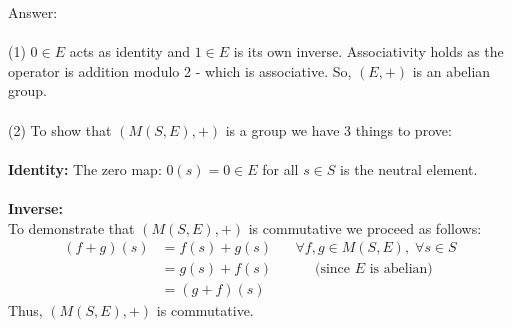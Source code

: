 \documentclass[12pt,a4paper]{article}
\begin{document}
\vspace{1cm}
\noindent Answer:\\
\\
(1) $0 \in E$ acts as identity and $1 \in E$ is its own inverse. Associativity holds as the operator is addition modulo 2 - which is associative.  So, $(E, +)$ is an abelian group. \\
\\
(2) To show that $(M(S,E), +)$ is a group we have 3 things to prove:\\
\\
\textbf{Identity:} The zero map: $0(s) = 0 \in E$ for all $s \in S$ is the neutral element.\\
\\
\textbf{Inverse:} 
\\
To demonstrate that $(M(S,E), +)$ is commutative we proceed as follows:
\begin{align*}
  (f+g)(s) &= f(s) + g(s) \;\;\;\;\;\; \forall f,g \in M(S,E), \; \forall s \in S \\
  &= g(s) + f(s) \;\;\;\;\;\;\;\;\;\;\; \text{(since $E$ is abelian)}\\
  &= (g+f)(s)
\end{align*}
Thus, $(M(S,E), +)$ is commutative.
\end{document}
